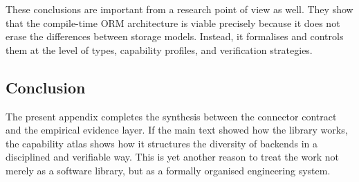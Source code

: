 These conclusions are important from a research point of view as well. They show that the compile-time ORM architecture is viable precisely because it does not erase the differences between storage models. Instead, it formalises and controls them at the level of types, capability profiles, and verification strategies.

\subsection{Conclusion}

The present appendix completes the synthesis between the connector contract and the empirical evidence layer. If the main text showed how the library works, the capability atlas shows how it structures the diversity of backends in a disciplined and verifiable way. This is yet another reason to treat the work not merely as a software library, but as a formally organised engineering system.
